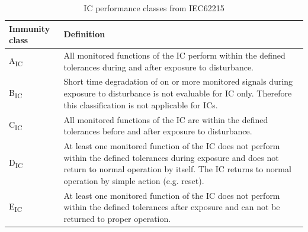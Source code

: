 \begin{table}[!h]
\centering
\begin{tabular}{l|p{}}
Immunity class  & Definition   \\ \midrule
A\textsubscript{IC}   & All monitored functions of the IC perform within the defined tolerances during and after exposure to disturbance.      \\ \midrule
B\textsubscript{IC}   & Short time degradation of on or more monitored signals during exposure to disturbance is not evaluable for IC only. Therefore this classification is not applicable for ICs. \\ \midrule
C\textsubscript{IC}   & All monitored functions of the IC are within the defined tolerances before and after exposure to disturbance.        \\ \midrule
D\textsubscript{IC}   &  At least one monitored function of the IC does not perform within the defined tolerances during exposure and does not return to normal operation by itself. The IC returns to normal operation by simple action (e.g. reset).   \\ \midrule
E\textsubscript{IC}   &  At least one monitored function of the IC does not perform within the defined tolerances after exposure and can not be returned to proper operation.  \\
\bottomrule
\end{tabular}
\caption{IC performance classes from IEC62215}
\label{tab:class-a-levels}
\end{table}
